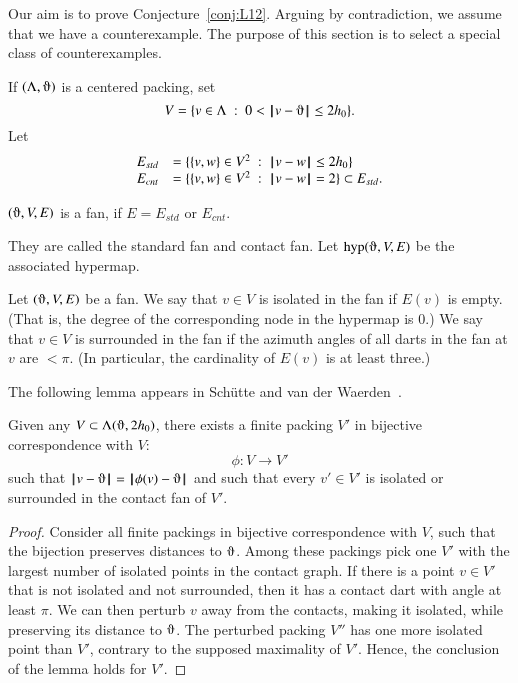 Our aim is to prove Conjecture~\ref{conj:L12}.  Arguing by contradiction, we assume that we have a counterexample.  The purpose of this section is to select a special class of counterexamples.

If $(\Lambda,\orgn)$ is a centered packing, set
$$
V = \{v\in \Lambda\mid 0 < \norm{v}{\orgn}\le 2\hm\}.
$$
Let
\begin{equation}\label{eqn:fan-edge}
\begin{array}{lll}
 E_{std} &= \{\{v,w\}\in V^2\ :\  {\hskip0.1em|\hskip-0.15em|\hskip0.1em}v - w{\hskip0.1em|\hskip-0.15em|\hskip0.1em}\le 2{h_0} \}\\
 E_{cnt} &= \{\{v,w\}\in V^2\ :\  {\hskip0.1em|\hskip-0.15em|\hskip0.1em}v - w{\hskip0.1em|\hskip-0.15em|\hskip0.1em}= 2 \}\subset E_{std}.
\end{array}
\end{equation}

\begin{lemma}
$(\orgn,V,E)$ is a fan, if $E=E_{std}$ or $E_{cnt}$.
\end{lemma}
They are called the standard fan and contact fan.
Let $\op{hyp}(\orgn,V,E)$ be the associated hypermap.

\begin{definition}
Let $(\orgn,V,E)$ be a fan.
We say that $v\in V$ is isolated in the fan if $E(v)$ is empty.
(That is, the degree of the corresponding node in the hypermap is $0$.) We say that $v\in V$ is surrounded in the fan if the azimuth angles of all darts in the fan at $v$ are $<\pi$.  (In particular, the cardinality of $E(v)$ is at least three.)
\end{definition}

The following lemma appears in Sch\"utte and van der Waerden~\cite{vanderWaerden:1951}.

\begin{lemma}
Given any $V\subset \Lambda(\orgn,2\hm)$,
there exists a finite packing $V'$ 
in bijective correspondence with $V$:
$$
\phi:V\to V'
$$
such that $\norm{v}{\orgn} = \norm{\phi(v)}{\orgn}$ and
such that every $v'\in V'$
is isolated or surrounded in the contact fan of $V'$.
\end{lemma}

\begin{proof} Consider all finite packings in 
bijective correspondence with $V$, such that the
bijection preserves distances to $\orgn$.
Among these packings pick one $V'$ with the largest number
of isolated points in the contact graph.  If there is a point $v\in V'$ that
is not isolated and not surrounded, then it has a contact
dart with angle at least $\pi$.  We can then perturb $v$ away from the contacts, making it isolated, while preserving its distance to $\orgn$.  The perturbed packing $V''$ has one more isolated point than $V'$, contrary to the supposed maximality of $V'$.  Hence, the conclusion of the 
lemma holds for $V'$.
\end{proof}

